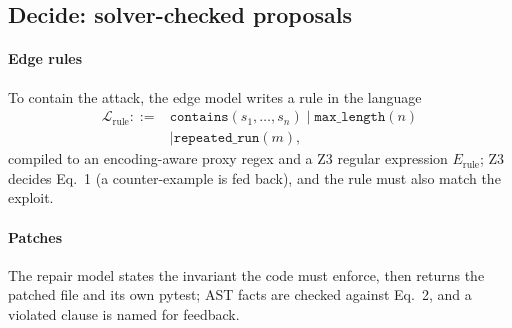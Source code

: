 \documentclass[journal]{IEEEtran}
\begin{document}
\subsection{Decide: solver-checked proposals}
\paragraph{Edge rules} To contain the attack, the edge model writes a rule in the language
\begin{equation}
\begin{split}
\mathcal{L}_{\mathrm{rule}} ::= {} & \mathtt{contains}(s_1, \dots, s_n) \mid \mathtt{max\_length}(n)\\
& \mid \mathtt{repeated\_run}(m),
\end{split}
\end{equation}
compiled to an encoding-aware proxy regex and a Z3 regular expression $E_{\mathrm{rule}}$; Z3 decides Eq.~1 (a counter-example is fed back), and the rule must also match the exploit.

\paragraph{Patches} The repair model states the invariant the code must enforce, then returns the patched file and its own pytest; AST facts are checked against Eq.~2, and a violated clause is named for feedback.
\end{document}
